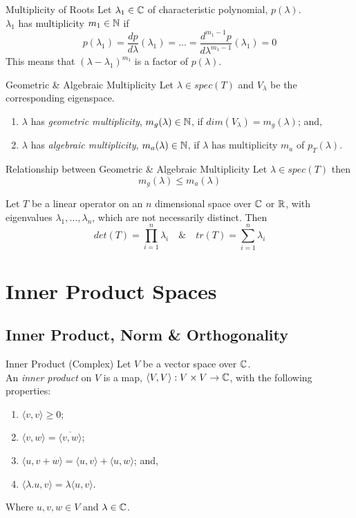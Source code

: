 \documentclass[11pt,a4paper]{article}
\begin{document}
\subtitle{Definition 8.18 - }{Multiplicity of Roots}
Let $\lambda_1 \in \mathbb{C}$ of characteristic polynomial, $p(\lambda)$.\\
$\lambda_1$ has multiplicity $m_1 \in \mathbb{N}$ if
$$p(\lambda_1) = \frac{dp}{d\lambda}(\lambda_1) = \dots = \frac{d^{m_1 - 1}p}{d\lambda^{m_1 - 1}}(\lambda_1) = 0$$
This means that $(\lambda - \lambda_1)^{m_1}$ is a factor of $p(\lambda)$.\\

\subtitle{Definition 8.19 - }{Geometric \& Algebraic Multiplicity}
Let $\lambda \in spec(T)$ and $V_\lambda$ be the corresponding eigenspace.
\begin{enumerate}[label=\roman*)]
  \item $\lambda$ has \textit{geometric multiplicity}, $m_g(\lambda) \in \mathbb{N}$, if $dim(V_\lambda) = m_g(\lambda)$; and,
  \item $\lambda$ has \textit{algebraic multiplicity}, $m_a(\lambda) \in \mathbb{N}$, if $\lambda$ has multiplicity $m_a$ of $p_T(\lambda)$.\\
\end{enumerate}

\subtitle{Theorem 8.20 - }{Relationship between Geometric \& Algebraic Multiplicity}
Let $\lambda \in spec(T)$ then $$m_g(\lambda) \leq m_a(\lambda)$$

\subtitle{Theorem 8.21}{}
Let $T$ be a linear operator on an $n$ dimensional space over $\mathbb{C}$ or $\mathbb{R}$, with eigenvalues $\lambda_1 , \dots , \lambda_n$, which are not necessarily distinct. Then
$$det(T) = \prod_{i=1}^n \lambda_i \quad \& \quad tr(T) = \sum_{i=1}^n \lambda_i$$

\section{Inner Product Spaces}

\subsection{Inner Product, Norm \& Orthogonality}

\subtitle{Definition 9.01 - }{Inner Product (Complex)}
Let $V$ be a vector space over $\mathbb{C}$.\\
An \textit{inner product} on $V$ is a map, $\langle V, V \rangle : V \times V \to \mathbb{C}$, with the following properties:
\begin{enumerate}[label=\roman*)]
  \item $\langle v, v \rangle \geq 0$;
  \item $\langle v, w \rangle = \overline{\langle v, w \rangle}$;
  \item $\langle u, v + w \rangle = \langle u, v \rangle + \langle u, w \rangle$; and,
  \item $\langle \lambda.u , v \rangle = \lambda \langle u, v \rangle$.
\end{enumerate}
Where $u, v, w \in V$ and $\lambda \in \mathbb{C}$.\\
\end{document}
